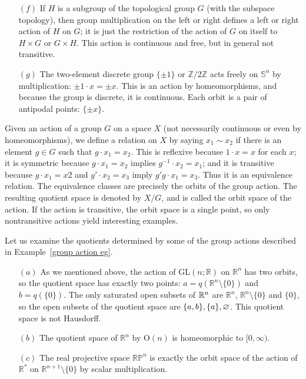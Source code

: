 \begin{example}
\begin{itemize}
\item[$(f)$]If $H$ is a subgroup of the topological group $G$ (with the subspace topology),
then group multiplication on the left or right defines a left or right action of $H$ on $G$; it is just the restriction of the action of $G$ on itself to $H\times G$ or $G\times H$. This action is continuous and free, but in general not transitive.
\item[$(g)$]The two-element discrete group $\{\pm1\}$ or $\mathbb{Z}/2\mathbb{Z}$ acts freely on $\mathbb{S}^n$ by multiplication: $\pm1\cdot x=\pm x$. This is an action by homeomorphisms, and because the group is discrete, it is continuous. Each orbit is a pair of antipodal points: $\{\pm x\}$.
\end{itemize}
\end{example}
Given an action of a group $G$ on a space $X$ (not necessarily continuous or even
by homeomorphisms), we define a relation on $X$ by saying $x_1\sim x_2$ if there is an
element $g\in G$ such that $g\cdot x_1=x_2$. This is reflexive because $1\cdot x=x$ for each $x$; it is symmetric because $g\cdot x_1=x_2$ implies $g^{-1}\cdot x_2=x_1$; and it is transitive because $g\cdot x_1 =x2$ and $g'\cdot x_2=x_3$ imply $g'g\cdot x_1=x_3$. Thus it is an equivalence relation. The equivalence classes are precisely the orbits of the group action. The resulting quotient space is denoted by $X/G$, and is called the orbit space of the action. If the action is transitive, the orbit space is a single point, so only nontransitive actions
yield interesting examples.\par
Let us examine the quotients determined by some of the group actions described
in Example~\ref{group action eg}.
\begin{example}
\mbox{}
\begin{itemize}
\item[$(a)$]As we mentioned above, the action of $\mathrm{GL}(n;\mathbb{R})$ on $\mathbb{R}^n$  has two orbits, so the quotient space has exactly two points: $a=q(\mathbb{R}^n\setminus\{0\})$ and $b=q(\{0\})$. The only saturated open subsets of $\mathbb{R}^n$ are $\mathbb{R}^n$, $\mathbb{R}^n\setminus\{0\}$ and $\{0\}$, so the open subsets of the quotient space are $\{a,b\},\{a\},\varnothing$. This quotient space is not Hausdorff.
\item[$(b)$]The quotient space of $\mathbb{R}^n$ by $\mathrm{O}(n)$ is homeomorphic to $[0,\infty)$.
\item[$(c)$]The real projective space $\mathbb{RP}^n$  is exactly the orbit space of the action of $\mathbb{R}^*$ on $\mathbb{R}^{n+1}\setminus\{0\}$ by scalar multiplication.
\end{itemize}
\end{example}
